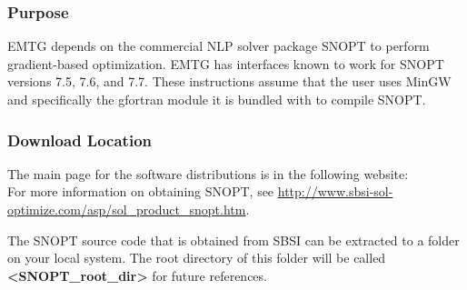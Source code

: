 
\subsubsection{Purpose}
\noindent \ac{EMTG} depends on the commercial \ac{NLP} solver package \ac{SNOPT} to perform gradient-based optimization. \ac{EMTG} has interfaces known to work for \ac{SNOPT} versions 7.5, 7.6, and 7.7. These instructions assume that the user uses MinGW and specifically the gfortran module it is bundled with to compile \ac{SNOPT}.

\subsubsection{Download Location}
\noindent The main page for the software distributions is in the following website: \\
For more information on obtaining \ac{SNOPT}, see \url{http://www.sbsi-sol-optimize.com/asp/sol_product_snopt.htm}.

\noindent The \ac{SNOPT} source code that is obtained from \ac{SBSI} can be extracted to a folder on your local system. The root directory of this folder will be called \textbf{\textless SNOPT\_root\_dir\textgreater} for future references.

